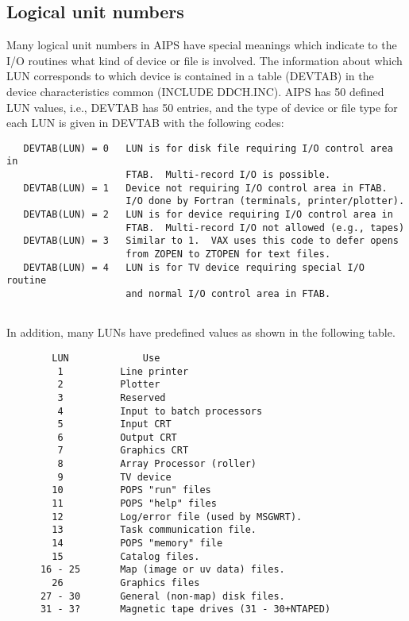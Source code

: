 \subsection{Logical unit numbers }

Many logical unit numbers in AIPS have special meanings which indicate
to the I/O routines what kind of device or file is involved. The
information about which LUN corresponds to which device is contained
in a table (DEVTAB) in the device characteristics common (INCLUDE
DDCH.INC).  AIPS has 50 defined LUN values, i.e.,
DEVTAB has 50 entries, and the type of device or file type for each
LUN is given in DEVTAB with the following codes:
\vspace{  0.85cm}

\begin{verbatim}
   DEVTAB(LUN) = 0   LUN is for disk file requiring I/O control area in
                     FTAB.  Multi-record I/O is possible.
   DEVTAB(LUN) = 1   Device not requiring I/O control area in FTAB.
                     I/O done by Fortran (terminals, printer/plotter).
   DEVTAB(LUN) = 2   LUN is for device requiring I/O control area in
                     FTAB.  Multi-record I/O not allowed (e.g., tapes)
   DEVTAB(LUN) = 3   Similar to 1.  VAX uses this code to defer opens
                     from ZOPEN to ZTOPEN for text files.
   DEVTAB(LUN) = 4   LUN is for TV device requiring special I/O routine
                     and normal I/O control area in FTAB.


\end{verbatim}
In addition, many LUNs have predefined values as shown in the
following table.
\vspace{  0.85cm}
\begin{verbatim}
        LUN             Use
         1          Line printer
         2          Plotter
         3          Reserved
         4          Input to batch processors
         5          Input CRT
         6          Output CRT
         7          Graphics CRT
         8          Array Processor (roller)
         9          TV device
        10          POPS "run" files
        11          POPS "help" files
        12          Log/error file (used by MSGWRT).
        13          Task communication file.
        14          POPS "memory" file
        15          Catalog files.
      16 - 25       Map (image or uv data) files.
        26          Graphics files
      27 - 30       General (non-map) disk files.
      31 - 3?       Magnetic tape drives (31 - 30+NTAPED)


\end{verbatim}

